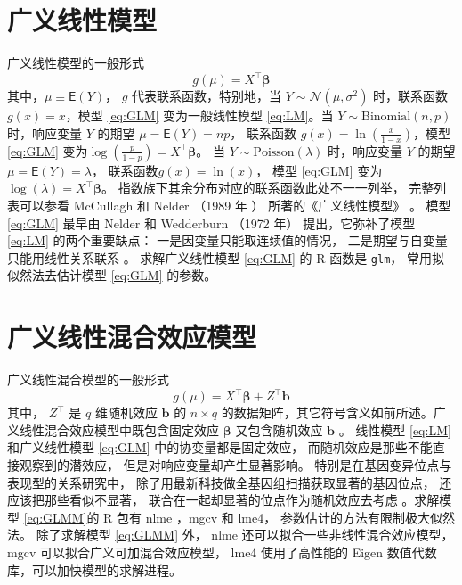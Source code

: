 \documentclass[12pt,a4paper,UTF8,twoside]{book}
\theoremstyle{definition}
\theoremstyle{definition}
\theoremstyle{definition}
\theoremstyle{remark}
\begin{document}
\hypertarget{sec:Generalized-Linear-Models}{%
\section{广义线性模型}\label{sec:Generalized-Linear-Models}}

广义线性模型的一般形式 \begin{equation}
g(\mu) = X^{\top}\boldsymbol{\beta}  \label{eq:GLM}
\end{equation} \noindent 其中，\(\mu \equiv \mathsf{E}(Y)\)， \(g\)
代表联系函数，特别地，当 \(Y \sim \mathcal{N}(\mu,\sigma^2)\)
时，联系函数 \(g(x) = x\)，模型 \eqref{eq:GLM} 变为一般线性模型
\eqref{eq:LM}。当 \(Y \sim \mathrm{Binomial}(n,p)\) 时，响应变量 \(Y\)
的期望 \(\mu =\mathsf{E}(Y) = np\)， 联系函数
\(g(x)=\ln(\frac{x}{1-x})\)，模型 \eqref{eq:GLM}
变为\(\log(\frac{p}{1-p})=X^{\top}\boldsymbol{\beta}\)。 当
\(Y \sim \mathrm{Poisson}(\lambda)\) 时，响应变量 \(Y\) 的期望
\(\mu =\mathsf{E}(Y) = \lambda\)， 联系函数\(g(x) = \ln(x)\)， 模型
\eqref{eq:GLM} 变为 \(\log(\lambda) = X^{\top}\boldsymbol{\beta}\)。
指数族下其余分布对应的联系函数此处不一一列举， 完整列表可以参看
McCullagh 和 Nelder （1989 年 ）\citep{McCullagh1989}
所著的《广义线性模型》 。 模型 \eqref{eq:GLM} 最早由 Nelder 和 Wedderburn
（1972 年）\citep{Nelder1972} 提出，它弥补了模型 \eqref{eq:LM}
的两个重要缺点： 一是因变量只能取连续值的情况，
二是期望与自变量只能用线性关系联系 \citep{Chen2011}。 求解广义线性模型
\eqref{eq:GLM} 的 R 函数是 \texttt{glm}， 常用拟似然法去估计模型
\eqref{eq:GLM} 的参数。

\hypertarget{sec:Generalized-Linear-Mixed-Effects-Models}{%
\section{广义线性混合效应模型}\label{sec:Generalized-Linear-Mixed-Effects-Models}}

广义线性混合模型的一般形式 \begin{equation}
g(\mu) = X^{\top}\boldsymbol{\beta} + Z^{\top}\mathbf{b}  \label{eq:GLMM}
\end{equation} \noindent 其中， \(Z^{\top}\) 是 \(q\) 维随机效应
\(\mathbf{b}\) 的 \(n \times q\)
的数据矩阵，其它符号含义如前所述。广义线性混合效应模型中既包含固定效应
\(\boldsymbol{\beta}\) 又包含随机效应 \(\mathbf{b}\) 。 线性模型
\eqref{eq:LM} 和广义线性模型 \eqref{eq:GLM} 中的协变量都是固定效应，
而随机效应是那些不能直接观察到的潜效应， 但是对响应变量却产生显著影响。
特别是在基因变异位点与表现型的关系研究中，
除了用最新科技做全基因组扫描获取显著的基因位点，
还应该把那些看似不显著， 联合在一起却显著的位点作为随机效应去考虑
\citep{Yang2010Common}。求解模型 \eqref{eq:GLMM}的 R 包有 nlme ，mgcv 和
lme4， 参数估计的方法有限制极大似然法。 除了求解模型 \eqref{eq:GLMM} 外，
nlme 还可以拟合一些非线性混合效应模型， mgcv
可以拟合广义可加混合效应模型， lme4 使用了高性能的 Eigen
数值代数库，可以加快模型的求解进程。
\end{document}
